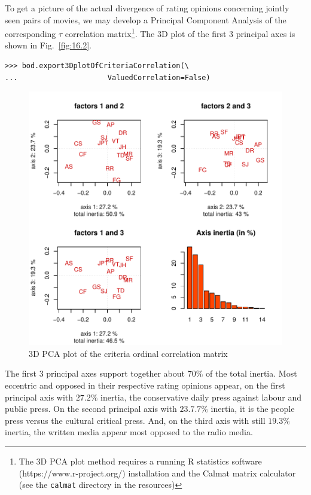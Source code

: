 To get a picture of the actual divergence of rating opinions concerning jointly seen pairs of movies, we may develop a Principal Component Analysis of the corresponding $\tau$ correlation matrix\footnote{The 3D PCA plot method requires a running R statistics software  (https://www.r-project.org/) installation and the Calmat matrix calculator (see the \texttt{calmat} directory in the \Digraph resources)}. The 3D plot of the first 3 principal axes is shown in Fig.~\vref{fig:16.2}.
\begin{lstlisting}
>>> bod.export3DplotOfCriteriaCorrelation(\
...                     ValuedCorrelation=False)
\end{lstlisting}
\begin{figure}[ht]
\includegraphics[width=0.9\hsize]{Figures/16-4-correlationPCA.pdf}
\caption{3D PCA plot of the criteria ordinal correlation matrix}
\label{fig:16.4}       %
\end{figure}

The first 3 principal axes support together about $70\%$ of the total inertia. Most eccentric and opposed in their respective rating opinions appear, on the first principal axis with $27.2\%$ inertia, the conservative daily press against labour and public press. On the second principal axis with $23.7.7\%$ inertia, it is the people press versus the cultural critical press. And, on the third axis with still $19.3\%$ inertia, the written media appear most opposed to the radio media.

